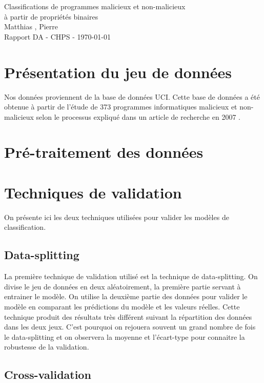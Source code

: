 \documentclass[11pt,a4paper]{article}
\begin{document}
\begin{center}

	{\LARGE\centering Classifications de programmes malicieux et non-malicieux\\ à partir de propriétés binaires}\\[1cm]

	{ Matthias , Pierre }\\[0.5cm]
	{Rapport DA - CHPS - \today}
\end{center}

\tableofcontents

\section{Présentation du jeu de données}
	Nos données proviennent de la base de données UCI\cite{UCI}.
	Cette base de données a été obtenue à partir de l'étude de 373 programmes informatiques malicieux et non-malicieux selon le processus expliqué dans un article de recherche en 2007 \cite{article}.

\section{Pré-traitement des données}

\section{Techniques de validation}

	On présente ici les deux techniques utilisées pour valider les modèles de classification.

	\subsection{Data-splitting}		
		La première technique de validation utilisé est la technique de data-splitting. On divise le jeu de données en deux aléatoirement, la première partie servant à entrainer le modèle. On utilise la deuxième partie des données pour valider le modèle en comparant les prédictions du modèle et les valeurs réelles.
		Cette technique produit des résultats très différent suivant la répartition des données dans les deux jeux. C'est pourquoi on rejouera souvent un grand nombre de fois le data-splitting et on observera la moyenne et l'écart-type pour connaitre la robustesse de la validation.

	\subsection{Cross-validation}
\end{document}
